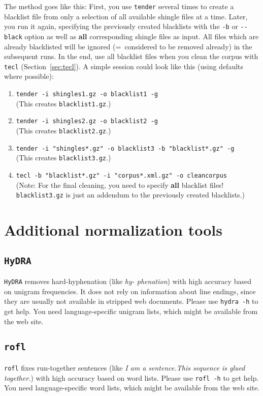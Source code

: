 \documentclass[12pt,a4paper]{article}
\begin{document}
The method goes like this:
First, you use \texttt{tender} several times to create a blacklist file from only a selection of all available shingle files at a time.
Later, you run it again, specifying the previously created blacklists with the \texttt{-b} or \texttt{-{-}black} option as well as \textbf{all} corresponding shingle files as input.
All files which are already blacklisted will be ignored (=~considered to be removed already) in the subsequent runs.
In the end, use all blacklist files when you clean the corpus with \texttt{tecl} (Section~\ref{sec:tecl}).
A simple session could look like this (using defaults where possible):

{\footnotesize
\begin{enumerate}
  \item \texttt{tender -i shingles1.gz -o blacklist1 -g}\\[1ex]
    (This creates \texttt{blacklist1.gz}.)
  \item \texttt{tender -i shingles2.gz -o blacklist2 -g}\\[1ex]
    (This creates \texttt{blacklist2.gz}.)
  \item \texttt{tender -i "shingles*.gz" -o blacklist3 -b "blacklist*.gz" -g}\\[1ex]
    (This creates \texttt{blacklist3.gz}.)
  \item \texttt{tecl -b "blacklist*.gz" -i "corpus*.xml.gz" -o cleancorpus}\\[1ex]
    (Note: For the final cleaning, you need to specify \textbf{all} blacklist files!
    \texttt{blacklist3.gz} is just an addendum to the previously created blacklists.)
\end{enumerate}
}

\section{Additional normalization tools}

\subsection{\texttt{HyDRA}}

\texttt{HyDRA} removes hard-hyphenation (like \textit{hy- phenation}) with high accuracy based on unigram frequencies.
It does not rely on information about line endings, since they are usually not available in stripped web documents.
Please use \texttt{hydra -h} to get help.
You need language-specific unigram lists, which might be available from the web site.

\subsection{\texttt{rofl}}

\texttt{rofl} fixes run-together sentences (like \textit{I am a sentence.This sequence is glued together.}) with high accuracy based on word lists.
Please use \texttt{rofl -h} to get help.
You need language-specific word lists, which might be available from the web site.

 

\end{document}
